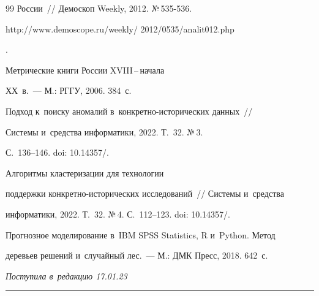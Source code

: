 {{\begin{thebibliography}{99}
России~/\!\!/ Демоскоп Weekly, 2012. №\,535-536. {\sf 


http://www.demoscope.ru/weekly/ 2012/0535/analit012.php}.




   Метрические книги России XVIII\,--\,на\-ча\-ла 


ХХ~в.~--- М.: РГГУ, 2006. 384~с.




   Подход к~поиску аномалий в~кон\-крет\-но-ис\-то\-ри\-че\-ских данных~/\!\!/ 


  Сис\-те\-мы и~средства информатики, 2022. Т.~32. №\,3.  


С.~136--146. doi: 10.14357\!/.




   Алгоритмы кластеризации для технологии 


поддержки конкретно-исторических исследований~/\!\!/ Сис\-те\-мы и~средства 


информатики, 2022. Т.~32. №\,4. С.~112--123. doi: 10.14357\!/.




   Прогнозное моделирование в~IBM SPSS Statistics, R и~Python. Метод 


деревьев решений и~случайный лес.~--- М.: ДМК Пресс, 2018. 642~с.





 \end{thebibliography}


} }











\vspace*{-6pt}





\hfill{\small\textit{Поступила в~редакцию 17.01.23}}





\vspace*{8pt}





\hrule





